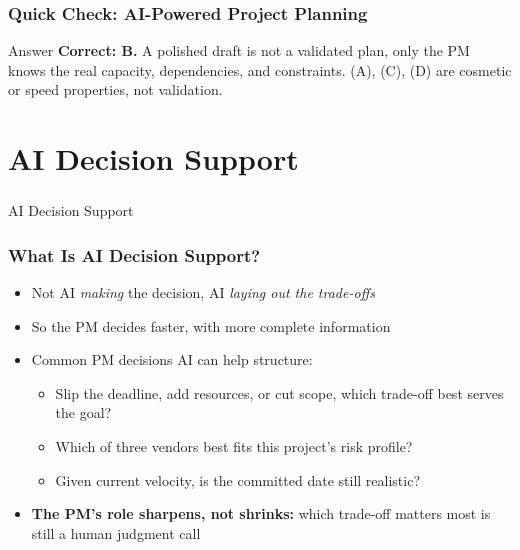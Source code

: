 \begin{frame}[fragile]\frametitle{Quick Check: AI-Powered Project Planning}
\begin{block}{Answer}
\textbf{Correct: B.} A polished draft is not a validated plan, only the PM knows the real capacity, dependencies, and constraints. (A), (C), (D) are cosmetic or speed properties, not validation.
\end{block}
\end{frame}

\section[Decision]{AI Decision Support}
\begin{frame}[fragile]\frametitle{}
\begin{center}
{\Large AI Decision Support}
\end{center}
\end{frame}

\begin{frame}[fragile]\frametitle{What Is AI Decision Support?}

\begin{itemize}
  \item Not AI \textit{making} the decision, AI \textit{laying out the trade-offs}
  \item So the PM decides faster, with more complete information
  \item Common PM decisions AI can help structure:
    \begin{itemize}
      \item Slip the deadline, add resources, or cut scope, which trade-off best serves the goal?
      \item Which of three vendors best fits this project's risk profile?
      \item Given current velocity, is the committed date still realistic?
    \end{itemize}
  \item \textbf{The PM's role sharpens, not shrinks:} which trade-off matters most is still a human judgment call
\end{itemize}

\end{frame}

